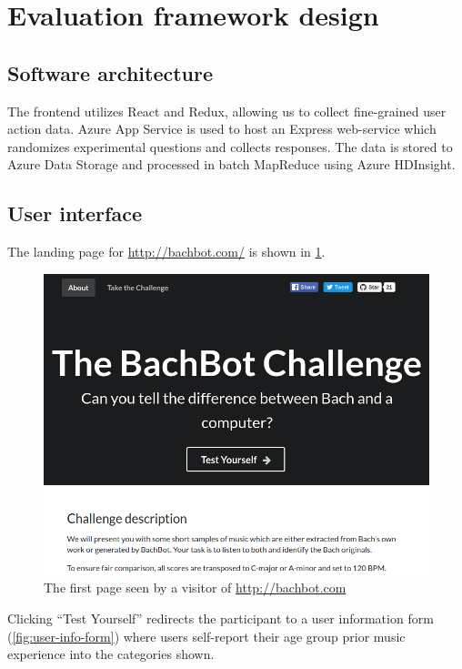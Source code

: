 \section{Evaluation framework design}

\subsection{Software architecture}

The frontend utilizes React and Redux, allowing us to collect fine-grained user
action data. Azure App Service is used to host an Express web-service which
randomizes experimental questions and collects responses. The data is stored to
Azure Data Storage and processed in batch MapReduce using Azure HDInsight.

\subsection{User interface}

The landing page for \url{http://bachbot.com/} is shown in \cref{fig:bachbot-front-page}.

\begin{figure}[tb]
  \centering
  \includegraphics[width=1.0\linewidth]{bachbot-front-page.png}
  \caption{The first page seen by a visitor of \url{http://bachbot.com}}
  \label{fig:bachbot-front-page}
\end{figure}

Clicking ``Test Yourself'' redirects the participant to a user information form
(\cref{fig:user-info-form}) where users self-report their age
group prior music experience into the categories shown.

